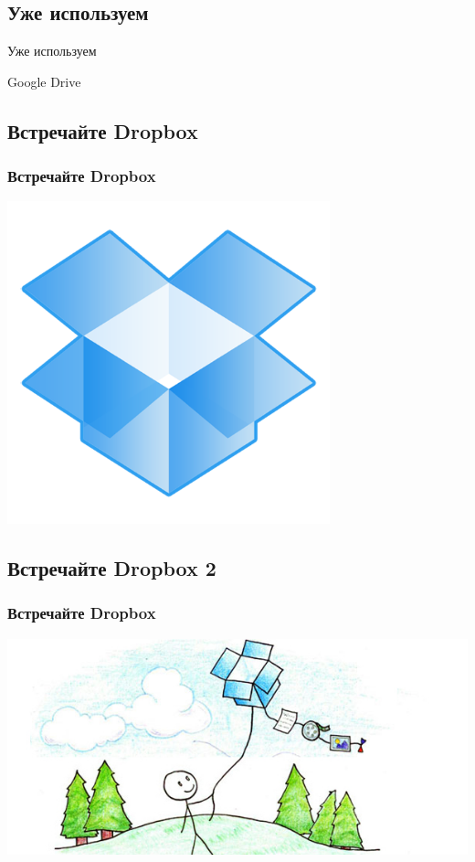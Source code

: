 \documentclass[compress,red]{beamer}
\begin{document}
\subsection{Уже используем}
\begin{frame}
  \begin{center}
    \Huge{Уже используем}
  \end{center}
  \begin{center}
    \Large{Google Drive}
  \end{center}
\end{frame}

\subsection{Встречайте Dropbox}
\begin{frame}[fragile]
  \frametitle{Встречайте Dropbox}
  \centerline{\includegraphics[width=0.7\textwidth]{images/dropbox-icon.png}}
\end{frame}

\subsection{Встречайте Dropbox 2}
\begin{frame}[fragile]
  \frametitle{Встречайте Dropbox}
  \centerline{\includegraphics[width=1.0\textwidth]{images/ilovedropbox1.jpg}}
\end{frame}
\end{document}
